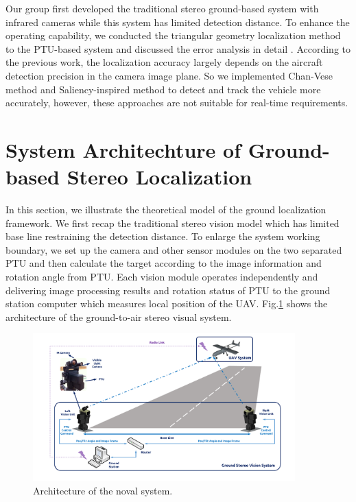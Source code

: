 Our group first developed the traditional stereo ground-based system with infrared cameras \cite{kong2013autonomous} while this system has limited detection distance. To enhance the operating capability, we conducted the triangular geometry localization method to the PTU-based system and discussed the error analysis in detail \cite{kong2014ground}. According to the previous work, the localization accuracy largely depends on the aircraft detection precision in the camera image plane. So we implemented Chan-Vese method \cite{tang2016ground} and Saliency-inspired method \cite{ma2016stereo} to detect and track the vehicle more accurately, however, these approaches are not suitable for real-time requirements.





\section{System Architechture of Ground-based Stereo Localization}
In this section, we illustrate the theoretical model of the ground localization framework. We first recap the traditional stereo vision model which has limited base line restraining the detection distance. To enlarge the system working boundary, we set up the camera and other sensor modules on the two separated PTU and then calculate the target according to the image information and rotation angle from PTU. Each vision module operates independently and delivering image processing results and rotation status of PTU to the ground station computer which measures local position of the UAV. Fig.\ref{fig:SystemStructure} shows the architecture of the ground-to-air stereo visual system.


\begin{figure}[!tb]
	\centering
	\includegraphics[width=0.9\textwidth]{Figs/SystemStructure2.pdf}
	\caption{Architecture of the noval system.}
	\label{fig:SystemStructure}
\end{figure}




